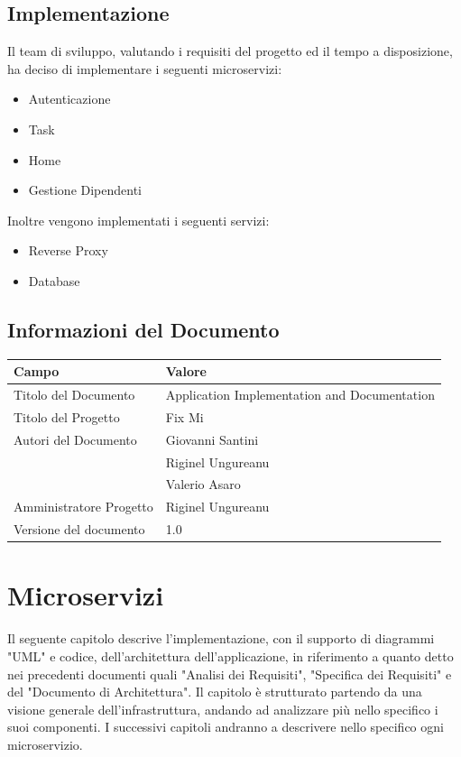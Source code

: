 \documentclass{report}
\begin{document}
	\section{Implementazione}
	Il team di sviluppo, valutando i requisiti del progetto ed il tempo a disposizione, ha deciso di implementare i seguenti microservizi:
	\begin{itemize}
		\item Autenticazione
		\item Task
		\item Home
		\item Gestione Dipendenti
	\end{itemize}
	Inoltre vengono implementati i seguenti servizi:
	\begin{itemize}
		\item Reverse Proxy
		\item Database
	\end{itemize}
	
	
	\section{Informazioni del Documento}
	
	\begin{center} %
		\centering
		\begin{tabular}{ |p{4cm}|p{4cm}|  }
			\hline
			\centering Campo & \qquad\qquad Valore \\ %
			\hline
			Titolo del Documento & Application Implementation and Documentation \\
			\hline
			Titolo del Progetto & Fix Mi \\
			\hline
			Autori del Documento &
			Giovanni Santini \\ & Riginel Ungureanu \\ & Valerio Asaro \\
			\hline
			Amministratore Progetto & Riginel Ungureanu\\
			\hline
			Versione del documento & 1.0 \\
			\hline
		\end{tabular}
	\end{center}
	
	
	
\chapter{Microservizi}

Il seguente capitolo descrive l'implementazione, con il supporto di diagrammi "UML" e codice, dell'architettura dell'applicazione, in riferimento a quanto detto nei precedenti documenti quali "Analisi dei Requisiti", "Specifica dei Requisiti" e del "Documento di Architettura".  Il capitolo è strutturato partendo da una visione generale dell'infrastruttura, andando ad analizzare più nello specifico i suoi componenti. I successivi capitoli andranno a descrivere nello specifico ogni microservizio.
\end{document}
